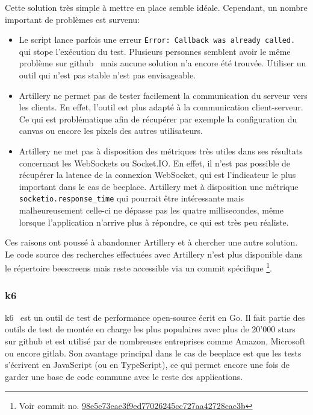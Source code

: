 Cette solution très simple à mettre en place semble idéale. Cependant, un nombre important de problèmes est survenu:

\begin{itemize}
  \item Le script lance parfois une erreur \texttt{Error: Callback was already called.} qui stope l'exécution du test. Plusieurs personnes semblent avoir le même problème sur \gls{github}~\cite{artillery-callback-issue} mais aucune solution n'a encore été trouvée. Utiliser un outil qui n'est pas stable n'est pas envisageable.
  \item Artillery ne permet pas de tester facilement la communication du serveur vers les clients. En effet, l'outil est plus adapté à la communication client-serveur. Ce qui est problématique afin de récupérer par exemple la configuration du canvas ou encore les pixels des autres utilisateurs.
  \item Artillery ne met pas à disposition des métriques très utiles dans ses résultats concernant les WebSockets ou Socket.IO. En effet, il n'est pas possible de récupérer la latence de la connexion WebSocket, qui est l'indicateur le plus important dans le cas de \gls{beeplace}. Artillery met à disposition une métrique \texttt{socketio.response_time} qui pourrait être intéressante mais malheureusement celle-ci ne dépasse pas les quatre millisecondes, même lorsque l'application n'arrive plus à répondre, ce qui est très peu réaliste.
\end{itemize}

Ces raisons ont poussé à abandonner Artillery et à chercher une autre solution. Le code source des recherches effectuées avec Artillery n'est plus disponible dans le répertoire \gls{beescreens} mais reste accessible via un commit spécifique \footnote{Voir commit no. \href{https://gitlab.com/beescreens/beescreens/-/merge_requests/255/diffs?commit_id=98e5e73eae3f9ed77026245cc727aa42728cac3b}{98e5e73eae3f9ed77026245cc727aa42728cac3b}}.

\subsubsection{k6}

k6~\cite{k6} est un outil de test de performance open-source écrit en Go. Il fait partie des outils de test de montée en charge les plus populaires avec plus de 20'000 stars sur \gls{github} et est utilisé par de nombreuses entreprises comme Amazon, Microsoft ou encore \gls{gitlab}. Son avantage principal dans le cas de \gls{beeplace} est que les tests s'écrivent en JavaScript (ou en TypeScript), ce qui permet encore une fois de garder une base de code commune avec le reste des applications.

